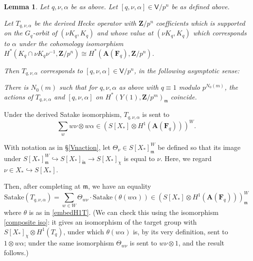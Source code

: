 \documentclass[10pt]{amsart}
\newcommand{\Z}{\mathbf{Z}}
\newcommand{\Vinf}{\mathsf{V}}
\newtheorem{lemma}[subsection]{Lemma}
\theoremstyle{remark}
\newcommand{\F}{\mathbf{F}}
\begin{document}
  \begin{lemma} \label{reciprocity law}
Let $q, \nu, \alpha$ be as above.   Let $[q, \nu, \alpha] \in \Vinf/p^n$ be as defined above. 

  
Let $T_{q, \nu,\alpha}$ be the derived Hecke operator with $\Z/p^n$ coefficients which is 
supported on the $G_q$-orbit of $(\nu K_q, K_q)$ and 
whose value at $(\nu K_q, K_q)$
which corresponds to $\alpha$ under the   cohomology isomorphism $H^*(K_q \cap \nu K_q \nu^{-1}, \Z/p^n) \cong H^*(\mathbf{A}(\F_q), \Z/p^n)$. 

Then $T_{q,\nu,\alpha}$ corresponds to $[q, \nu,\alpha] \in \Vinf/p^n$, in the following asymptotic sense:

 There is $N_0(m)$ such that  for  $q ,\nu, \alpha$ as above with 
 $q \equiv 1$ modulo $p^{N_0(m)}$, 
 the actions of  $T_{q, \nu, \alpha}$ and $[q, \nu,\alpha]$
 on $H^*(Y(1), \Z/p^m)_{\mathfrak{m}}$ coincide. 
\end{lemma}
  \proof
Under the derived Satake isomorphism, $T_{q,\nu, \alpha}$ is sent to  
$$\sum_{w} w \nu\otimes w \alpha
\in \left(S[X_*] \otimes H^1(\mathbf{A}(\F_q))\right)^W.$$   

With notation as in \S \ref{Vnaction}, 
let $\Theta_{\nu} \in S[X_*]_{\mathfrak{m}}^W$ be  defined
so that its image under $S[X_*]_{\mathfrak{m}}^W \hookrightarrow S[X_*]_{\tilde{\mathfrak{m}}} \rightarrow S[X_*]_{\chi}$
is equal to $\nu$. Here, we regard $\nu \in X_* \hookrightarrow S[X_*]$. 

 
 Then, after completing at $\mathfrak{m}$, we have an equality
  $$\mathrm{Satake}(T_{q,\nu,\alpha}) =   \sum_{w \in W}  \Theta_{w \nu} \cdot  \mbox{Satake}(\theta(w \alpha)) \in (S[X_*] \otimes H^1(\mathbf{A}(\F_q)))^W_{\mathfrak{m}}$$
 where $\theta$ is as in \eqref{embedH1T}.  (We can check this using the isomorphism  \eqref{composite iso}:
 it gives an isomorphism of the target group with  $S[X_*]_{\chi} \otimes H^1(T_q)$,
 under which $\theta(w \alpha)$ is, by its very definition,  sent to $1 \otimes w \alpha$; under the same isomorphism $\Theta_{w \nu}$ 
 is sent to $w \nu \otimes 1$, and the result follows.) 
 
  
 
\end{document}
